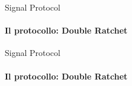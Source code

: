 \begin{frame}{Signal Protocol}
    \framesubtitle{Il protocollo: Double Ratchet}

    

\end{frame}

\begin{frame}{Signal Protocol}
    \framesubtitle{Il protocollo: Double Ratchet}
    
\end{frame}

